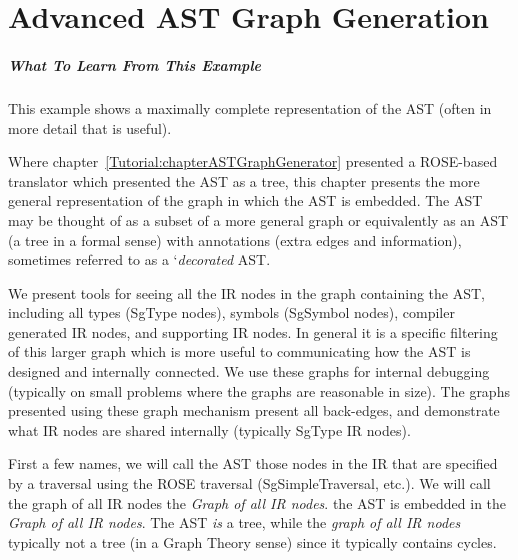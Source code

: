 \chapter{Advanced AST Graph Generation}
\label{Tutorial:chapterGeneralASTGraphGeneration}
\paragraph{What To Learn From This Example}
This example shows a maximally complete representation of the AST 
(often in more detail that is useful).

Where chapter~\ref{Tutorial:chapterASTGraphGenerator}
presented a ROSE-based translator which presented the AST as a tree, this chapter
presents the more general representation of the graph in which the AST is embedded.
The AST may be thought of as a subset of a more general graph or equivalently as
an AST (a tree in a formal sense) with annotations (extra edges and information),
sometimes referred to as a `{\em decorated} AST.

We present tools for seeing all the IR nodes in the graph containing the AST, including all types 
(SgType nodes), symbols (SgSymbol nodes), compiler generated IR nodes, and 
supporting IR nodes. In general
it is a specific filtering of this larger graph which is more useful to communicating
how the AST is designed and internally connected.  We use these graphs for internal 
debugging (typically on small problems where the graphs are reasonable in size).
The graphs presented using these graph mechanism present all back-edges, and
demonstrate what IR nodes are shared internally (typically SgType IR nodes).

First a few names, we will call the AST those nodes in the IR that are 
specified by a traversal using the ROSE traversal (SgSimpleTraversal, etc.).
We will call the graph of all IR nodes the {\em Graph of all IR nodes}.
the AST is embedded in the {\em Graph of all IR nodes}.  The AST {\em is} a tree,
while the {\em graph of all IR nodes} typically not a tree (in a Graph Theory sense)
since it typically contains cycles.

